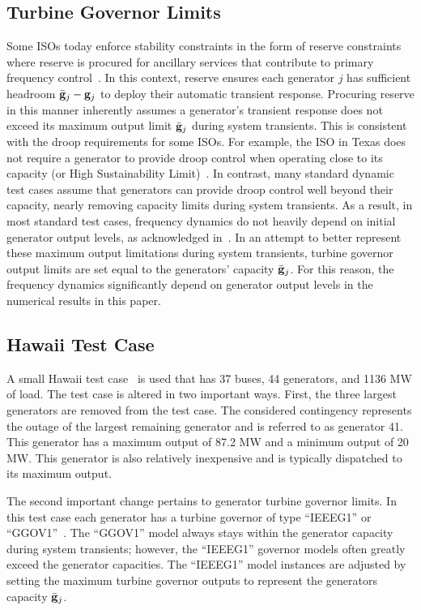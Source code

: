 \documentclass[lettersize,journal]{IEEEtran}
\begin{document}
\subsection{Turbine Governor Limits}\label{Sec:GovLimits}
Some ISOs today enforce stability constraints in the form of reserve constraints where reserve is procured for ancillary services that contribute to primary frequency control~\cite{mago2020new,li2018design,liu2018participation}.  In this context, reserve ensures each generator $j$ has sufficient headroom $\bar{\bold{g}}_j-\bold{g}_j$ to deploy their automatic transient response.  Procuring reserve in this manner inherently assumes a generator's transient response does not exceed its maximum output limit $\bar{\bold{g}}_j$ during system transients.  This is consistent with the droop requirements for some ISOs.  For example, the ISO in Texas does not require a generator to provide droop control when operating close to its capacity (or High Sustainability Limit)~\cite{ERCOTGuide}.  In contrast, many standard dynamic test cases assume that generators can provide droop control well beyond their capacity, nearly removing capacity limits during system transients.  As a result, in most standard test cases, frequency dynamics do not heavily depend on initial generator output levels, as acknowledged in~\cite{zhang2021encoding}. In an attempt to better represent these maximum output limitations during system transients, turbine governor output limits are set equal to the generators' capacity $\bar{\bold{g}}_j$.  For this reason, the frequency dynamics significantly depend on generator output levels in the numerical results in this paper.

\subsection{Hawaii Test Case}\label{sec:testcase}
A small Hawaii test case~\cite{TexasAMRepo} is used that has 37 buses, 44 generators, and 1136 MW of load.  The test case is altered in two important ways.  First, the three largest generators are removed from the test case.  The considered contingency represents the outage of the largest remaining generator and is referred to as generator 41.  This generator has a maximum output of 87.2 MW and a minimum output of 20 MW.  This generator is also relatively inexpensive and is typically dispatched to its maximum output.%

The second important change pertains to generator turbine governor limits. In this test case each generator has a turbine governor of type ``IEEEG1'' or ``GGOV1''~\cite{PowerWorld}. The ``GGOV1'' model always stays within the generator capacity during system transients; however, the ``IEEEG1'' governor models often greatly exceed the generator capacities.  The ``IEEEG1'' model instances are adjusted by setting the maximum turbine governor outputs to represent the generators capacity $\bar{\bold{g}}_j$.
\end{document}
